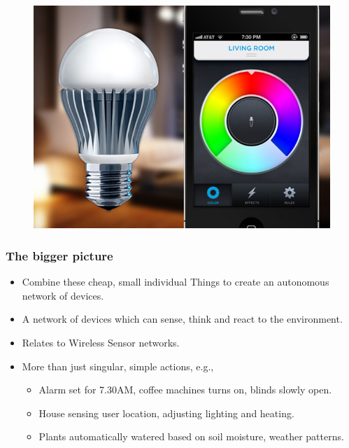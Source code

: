 \documentclass{beamer}
\begin{document}
\begin{frame}[t]
\begin{figure}[htb]
\begin{minipage}{0.3\textwidth}
        \centering
          \includegraphics[scale=0.1]{presentation/img/smart-light.jpg}
      \end{minipage}
    \end{figure}
  \end{frame}

  \begin{frame}[t]\frametitle{The bigger picture}
  \begin{itemize}
    \item Combine these cheap, small individual Things to create an autonomous network of devices.
    \item A network of devices which can sense, think and react to the environment.
    \item Relates to Wireless Sensor networks.
    \item More than just singular, simple actions, e.g.,
    \begin{itemize}
      \item Alarm set for 7.30AM, coffee machines turns on, blinds slowly open.
      \item House sensing user location, adjusting lighting and heating.
      \item Plants automatically watered based on soil moisture, weather patterns. 
    \end{itemize}
  \end{itemize}
  \end{frame}
\end{document}
